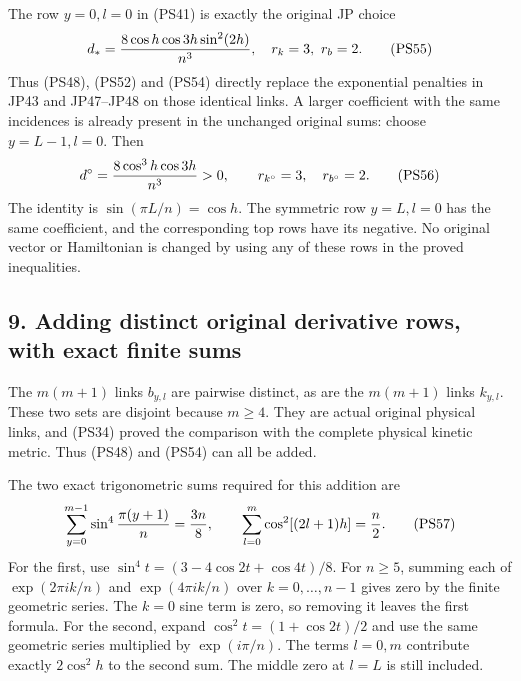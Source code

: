 \documentclass[11pt]{article}
\begin{document}
The row \(y=0,l=0\) in (PS41) is exactly the original JP choice
\[
 d_*={8\cos h\cos3h\sin^2(2h)\over n^3},\quad r_k=3,\ r_b=2.
 \tag{PS55}
\]
Thus (PS48), (PS52) and (PS54) directly replace the exponential
penalties in JP43 and JP47–JP48 on those identical links.
A larger coefficient with the same incidences is already present
in the unchanged original sums: choose \(y=L-1,l=0\). Then
\[
 d^\circ={8\cos^3h\cos3h\over n^3}>0,\qquad
 r_{k^\circ}=3,\quad r_{b^\circ}=2.
 \tag{PS56}
\]
The identity is
\(\sin(\pi L/n)=\cos h\). The symmetric row \(y=L,l=0\)
has the same coefficient, and the corresponding top rows have
its negative. No original vector or Hamiltonian is changed by
using any of these rows in the proved inequalities.

\subsection*{9. Adding distinct original derivative rows, with exact finite sums}

The \(m(m+1)\) links \(b_{y,l}\) are pairwise distinct, as are the
\(m(m+1)\) links \(k_{y,l}\). These two sets are disjoint because
\(m\ge4\). They are actual original physical links, and (PS34)
proved the comparison with the complete physical kinetic metric.
Thus (PS48) and (PS54) can all be added.

The two exact trigonometric sums required for this addition are
\[
 \sum_{y=0}^{m-1}\sin^4{\pi(y+1)\over n}={3n\over8},\qquad
 \sum_{l=0}^{m}\cos^2[(2l+1)h]={n\over2}.
 \tag{PS57}
\]
For the first, use
\(\sin^4 t=(3-4\cos2t+\cos4t)/8\).
For \(n\ge5\), summing each of
\(\exp(2\pi i k/n)\) and \(\exp(4\pi i k/n)\) over
\(k=0,\ldots,n-1\) gives zero by the finite geometric series.
The \(k=0\) sine term is zero, so removing it leaves the first
formula. For the second, expand
\(\cos^2t=(1+\cos2t)/2\) and use the same geometric series
multiplied by \(\exp(i\pi/n)\).
The terms \(l=0,m\) contribute exactly \(2\cos^2h\) to the
second sum. The middle zero at \(l=L\) is still included.
\end{document}
